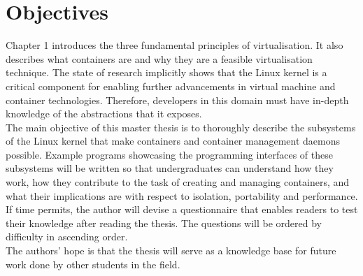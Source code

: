 \documentclass[english]{lni}
\begin{document}
\section{Objectives}
Chapter 1 introduces the three fundamental principles of virtualisation. 
It also describes what containers are and why they are a feasible 
virtualisation technique. 
The state of research implicitly shows that the Linux kernel 
is a critical component for enabling further advancements in virtual machine 
and container technologies. Therefore, developers in this domain must have 
in-depth knowledge of the abstractions that it exposes.\\
The main objective of this master thesis is to thoroughly describe the 
subsystems of the Linux kernel that make containers and container 
management daemons possible. 
Example programs showcasing the programming interfaces of these subsystems 
will be written so that undergraduates can understand how they work, 
how they contribute to the task of creating and managing containers, 
and what their implications are with respect to isolation, portability and 
performance.
If time permits, the author will devise a questionnaire that enables readers 
to test their knowledge after reading the thesis. The questions will be 
ordered by difficulty in ascending order.\\ 
The authors' hope is that the thesis will serve as a knowledge base for 
future work done by other students in the field. 
\end{document}
